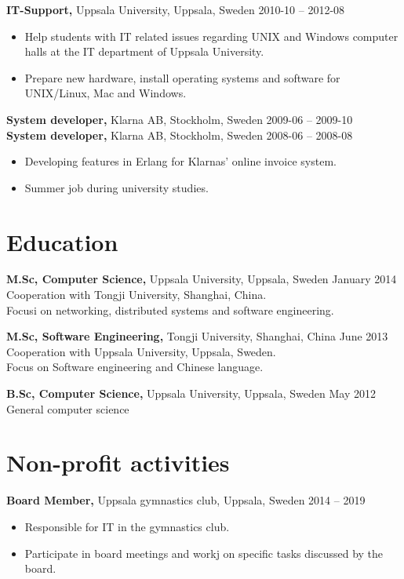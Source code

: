\documentclass[margin]{res}
\begin{document}
\begin{resume}
{\bf IT-Support,} Uppsala University, Uppsala, Sweden \hfill 2010-10 -- 2012-08
 \begin{itemize} \itemsep -2pt  %
 \item Help students with IT related issues regarding UNIX and Windows
   computer halls at the IT department of Uppsala University.
 \item Prepare new hardware, install operating systems and software for UNIX/Linux, Mac and Windows.
 \end{itemize}

{\bf System developer,} Klarna AB, Stockholm, Sweden \hfill 2009-06 -- 2009-10\\
{\bf System developer,} Klarna AB, Stockholm, Sweden \hfill 2008-06 -- 2008-08
 \begin{itemize} \itemsep -2pt  %
 \item Developing features in Erlang for Klarnas' online invoice system.
 \item Summer job during university studies.
 \end{itemize}

\section{Education}
{\bf M.Sc,  Computer Science,} Uppsala University, Uppsala, Sweden \hfill January 2014 \\
Cooperation with Tongji University, Shanghai, China. \\
Focusi on networking, distributed systems and software engineering.

{\bf M.Sc, Software Engineering,} Tongji University, Shanghai, China \hfill June 2013 \\
Cooperation with Uppsala University, Uppsala, Sweden.\\
Focus on Software engineering and Chinese language.

{\bf B.Sc, Computer Science,} Uppsala University, Uppsala, Sweden \hfill May 2012 \\
General computer science

\newpage
\section{Non-profit activities}

{\bf Board Member,} Uppsala gymnastics club, Uppsala, Sweden \hfill 2014 -- 2019
\begin{itemize} \itemsep -2pt
\item Responsible for IT in the gymnastics club.
\item Participate in board meetings and workj on specific tasks discussed by the board.
\end{itemize}


\end{resume}
\end{document}
